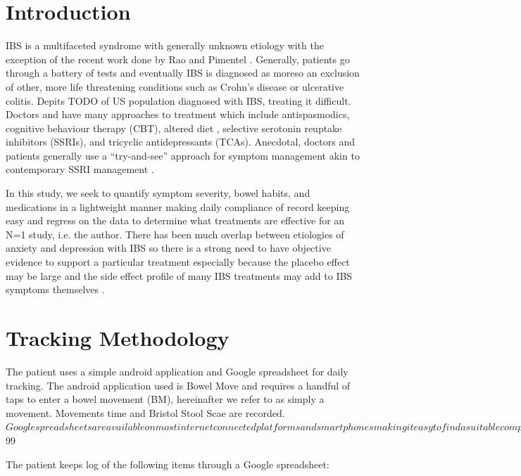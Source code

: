 \documentclass[conference]{IEEEtran}
\begin{document}
\section{Introduction}
IBS is a multifaceted syndrome with generally unknown etiology with the exception of the recent work done by Rao \cite{erdogan2015small} and Pimentel \cite{pimentel2000eradication}.  Generally, patients go through a battery of tests and eventually IBS is diagnosed as moreso an exclusion of other, more life threatening conditions such as Crohn's disease or ulcerative colitis.   Depits TODO of US population diagnosed with IBS, treating it difficult.  Doctors and have many approaches to treatment which include antispasmodics, cognitive behaviour therapy (CBT), altered diet \cite{gibson2010evidence}, selective serotonin reuptake inhibitors (SSRIs), and tricyclic antidepressants (TCAs). Anecdotal, doctors and patients generally use a “try-and-see” approach for symptom management akin to contemporary SSRI management \cite{trivedi2006evaluation}.

In this study, we seek to quantify symptom severity, bowel habits, and medications in a lightweight manner making daily compliance of record keeping easy and regress on the data to determine what treatments are effective for an N=1 study, i.e. the author.  There has been much overlap between etiologies of anxiety and depression with IBS so there is a strong need to have objective evidence to support a particular treatment especially because the placebo effect \cite{kaptchuk2008components} may be large and the side effect profile of many IBS treatments may add to IBS symptoms themselves \cite{vanderhoff2002proton}.

\section{Tracking Methodology}

The patient uses a simple android application and Google spreadsheet for daily tracking.  The android application used is Bowel Move \cite{bowelmove2017} and requires a handful of taps to enter a bowel movement (BM), hereinafter we refer to as simply a movement. Movements time and Bristol Stool Scae \cite{lewis1997stool} are recorded.  $Google spreadsheets are available on most internet connected platforms and smart phones making it easy to find a suitable computer to enter in daily data.  Together, compliance of the record keeping protocol exceeds $99%

The patient keeps log of the following items through a Google spreadsheet:
\end{document}
